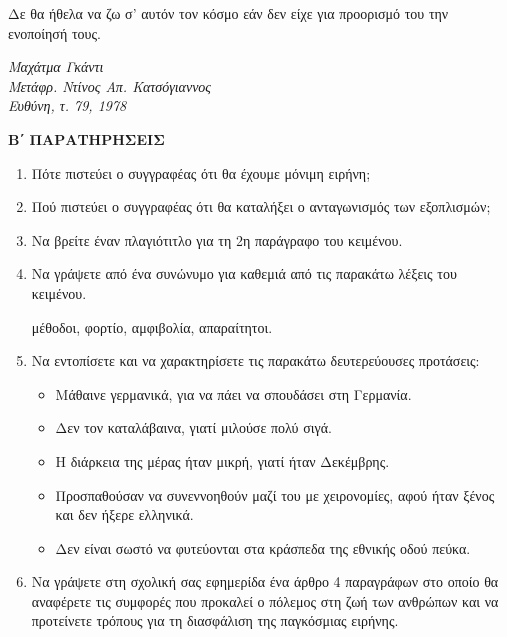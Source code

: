 \documentclass[twoside,nofonts,internet,fil,maria]{frontisthrio-diag}
\begin{document}
Δε θα ήθελα να ζω σ’ αυτόν τον κόσμο εάν δεν είχε για προορισμό του την ενοποίησή τους.\\
\begin{flushright}
\begin{minipage}{5.5cm}
\begin{flushleft}
\textit{Μαχάτμα Γκάντι\\
Μετάφρ. Ντίνος Απ. Κατσόγιαννος\\
Ευθύνη, τ. 79, 1978}
\end{flushleft}
\end{minipage}
\end{flushright}
\textcolor{\xrwma}{\textbf{B΄ ΠΑΡΑΤΗΡΗΣΕΙΣ}}
\begin{enumerate}
\item Πότε πιστεύει ο συγγραφέας ότι θα έχουμε μόνιμη ειρήνη;
\item Πού πιστεύει ο συγγραφέας ότι θα καταλήξει ο ανταγωνισμός των εξοπλισμών;
\item Να βρείτε έναν πλαγιότιτλο για τη 2η παράγραφο του κειμένου.
\item Να γράψετε από ένα συνώνυμο για καθεμιά από τις παρακάτω λέξεις του κειμένου.
\begin{center}
μέθοδοι, φορτίο, αμφιβολία, απαραίτητοι.
\end{center}
\item Να εντοπίσετε και να χαρακτηρίσετε τις παρακάτω δευτερεύουσες προτάσεις:
\begin{itemize}
\item Μάθαινε γερμανικά, για να πάει να σπουδάσει στη Γερμανία.
\item Δεν τον καταλάβαινα, γιατί μιλούσε πολύ σιγά.
\item Η διάρκεια της μέρας ήταν μικρή, γιατί ήταν Δεκέμβρης.
\item Προσπαθούσαν να συνεννοηθούν μαζί του με χειρονομίες, αφού ήταν ξένος και δεν ήξερε ελληνικά.
\item Δεν είναι σωστό να φυτεύονται στα κράσπεδα της εθνικής οδού πεύκα.
\end{itemize}
\item Να γράψετε στη σχολική σας εφημερίδα ένα άρθρο 4 παραγράφων στο οποίο θα αναφέρετε τις συμφορές που προκαλεί ο πόλεμος στη ζωή των ανθρώπων και να προτείνετε τρόπους για τη διασφάλιση της παγκόσμιας ειρήνης.
\end{enumerate}
\end{document}
